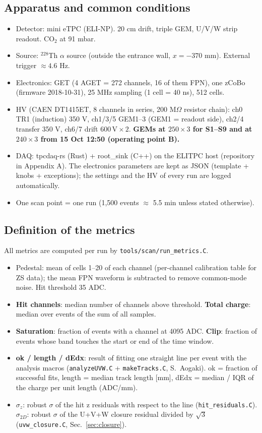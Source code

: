 \documentclass[a4paper,11pt]{article}
\begin{document}
\subsection{Apparatus and common conditions}
\begin{itemize}
\item Detector: mini eTPC (ELI-NP). 20 cm drift, triple GEM, U/V/W strip readout. CO$_2$ at 91 mbar.
\item Source: $^{228}$Th $\alpha$ source (outside the entrance wall, $x = -370$ mm). External trigger $\approx 4.6$ Hz.
\item Electronics: GET (4 AGET = 272 channels, 16 of them FPN), one zCoBo (firmware 2018-10-31), 25 MHz sampling (1 cell = 40 ns), 512 cells.
\item HV (CAEN DT1415ET, 8 channels in series, 200 M$\Omega$ resistor chain): ch0 TR1 (induction) 350 V, ch1/3/5 GEM1--3 (GEM1 = readout side), ch2/4 transfer 350 V, ch6/7 drift $600\,\mathrm{V} \times 2$.
  \textbf{GEMs at $250 \times 3$ for S1--S9 and at $240 \times 3$ from 15 Oct 12:50 (operating point B).}
\item DAQ: tpcdaq-rs (Rust) + root\_sink (C++) on the ELITPC host (repository in Appendix A). The electronics parameters are kept as JSON (template + knobs + exceptions); the settings and the HV of every run are logged automatically.
\item One scan point = one run (1,500 events $\approx$ 5.5 min unless stated otherwise).
\end{itemize}

\subsection{Definition of the metrics}
All metrics are computed per run by \texttt{tools/scan/run\_metrics.C}.
\begin{itemize}
\item Pedestal: mean of cells 1--20 of each channel (per-channel calibration table for ZS data); the mean FPN waveform is subtracted to remove common-mode noise. Hit threshold 35 ADC.
\item \textbf{Hit channels}: median number of channels above threshold. \textbf{Total charge}: median over events of the sum of all samples.
\item \textbf{Saturation}: fraction of events with a channel at 4095 ADC. \textbf{Clip}: fraction of events whose band touches the start or end of the time window.
\item \textbf{ok / length / dEdx}: result of fitting one straight line per event with the analysis macros (\texttt{analyzeUVW.C} + \texttt{makeTracks.C}, S.~Aogaki). ok = fraction of successful fits, length = median track length [mm], dEdx = median / IQR of the charge per unit length (ADC/mm).
\item $\sigma_z$: robust $\sigma$ of the hit z residuals with respect to the line (\texttt{hit\_residuals.C}). $\sigma_{2D}$: robust $\sigma$ of the U+V+W closure residual divided by $\sqrt{3}$ (\texttt{uvw\_closure.C}, Sec.~\ref{sec:closure}).
\end{itemize}
\end{document}
